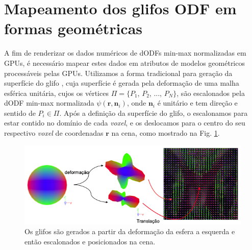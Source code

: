 \section{Mapeamento dos glifos ODF em formas geométricas}
\label{sec::renderizacao_de_glifos_ODF}


A fim de renderizar os dados numéricos de dODFs min-max normalizadas em GPUs, é necessário mapear estes dados em atributos de modelos geométricos processáveis pelas GPUs. Utilizamos a forma tradicional para geração da superfície do glifo \cite{peeters2009}, cuja superfície é gerada pela deformação de uma malha esférica unitária, cujos os vértices $\Pi = \{
P_1$,
$P_2$, ...,
$P_N
\}$, são escalonados pela dODF min-max normalizada $\psi(\mathbf{r}, \mathbf{n}_i)$, onde $\mathbf{n}_i$ é unitário e tem direção e sentido de $P_i \in \Pi$. Após a definição da superfície do glifo, o escalonamos para estar contido no domínio de cada \textit{voxel}, e os deslocamos para o centro do seu respectivo \textit{voxel} de coordenadas $\mathbf{r}$ na cena, como mostrado na Fig. \ref{fig::esfera_deformada_cena}.

\begin{figure}[htb]
    \centering
    \includegraphics[width=1.0\linewidth, angle=0]{figs/Esquema_Glifo/Renderizacao_multimodal.png}
    \caption{
    Os glifos são gerados a partir da deformação da esfera a esquerda e então escalonados e posicionados na cena.
    }
    \label{fig::esfera_deformada_cena}
\end{figure}


